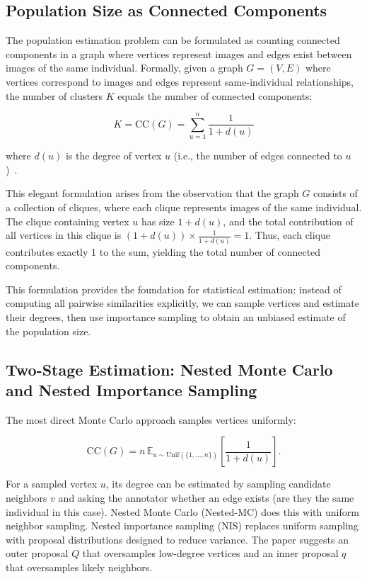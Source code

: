 \subsection{Population Size as Connected Components}

The population estimation problem can be formulated as counting connected components in a graph where vertices represent images and edges exist between images of the same individual. Formally, given a graph $G = (V, E)$ where vertices correspond to images and edges represent same-individual relationships, the number of clusters $K$ equals the number of connected components:

\begin{equation}
K = \text{CC}(G) = \sum_{u=1}^{n} \frac{1}{1 + d(u)}
\label{eq:connected_components}
\end{equation}

where $d(u)$ is the degree of vertex $u$ (i.e., the number of edges connected to $u$)~\cite{perez2024humanintheloopvisualreidpopulation}.

This elegant formulation arises from the observation that the graph $G$ consists of a collection of cliques, where each clique represents images of the same individual. The clique containing vertex $u$ has size $1 + d(u)$, and the total contribution of all vertices in this clique is $(1 + d(u)) \times \frac{1}{1 + d(u)} = 1$. Thus, each clique contributes exactly 1 to the sum, yielding the total number of connected components.

This formulation provides the foundation for statistical estimation: instead of computing all pairwise similarities explicitly, we can sample vertices and estimate their degrees, then use importance sampling to obtain an unbiased estimate of the population size.


\subsection{Two-Stage Estimation: Nested Monte Carlo and Nested Importance Sampling}
\label{sec:nis_theory}

The most direct Monte Carlo approach samples vertices uniformly:

\begin{equation}
\mathrm{CC}(G) = n\, \mathbb{E}_{u\sim \mathrm{Unif}(\{1,\dots,n\})}\left[\frac{1}{1+d(u)}\right].
\label{eq:cc_uniform_expectation}
\end{equation}

For a sampled vertex \(u\), its degree can be estimated by sampling candidate neighbors \(v\) and asking the annotator whether an edge exists (are they the same individual in this case). Nested Monte Carlo (Nested-MC) does this with uniform neighbor sampling. Nested importance sampling (NIS) replaces uniform sampling with proposal distributions designed to reduce variance. The paper suggests an outer proposal \(Q\) that oversamples low-degree vertices and an inner proposal \(q\) that oversamples likely neighbors\cite{perez2024humanintheloopvisualreidpopulation}.

